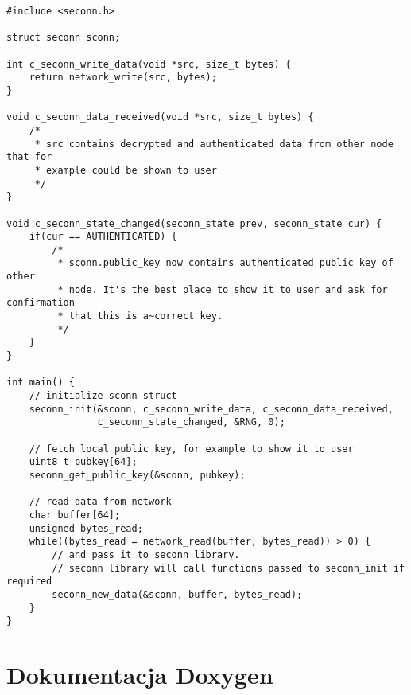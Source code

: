 \label{tab:sample-usage}
\begin{lstlisting}
#include <seconn.h>

struct seconn sconn;

int c_seconn_write_data(void *src, size_t bytes) {
    return network_write(src, bytes);
}

void c_seconn_data_received(void *src, size_t bytes) {
    /*
     * src contains decrypted and authenticated data from other node that for
     * example could be shown to user
     */
}

void c_seconn_state_changed(seconn_state prev, seconn_state cur) {
    if(cur == AUTHENTICATED) {
        /*
         * sconn.public_key now contains authenticated public key of other
         * node. It's the best place to show it to user and ask for confirmation
         * that this is a~correct key.
         */
    }
}

int main() {
    // initialize sconn struct
    seconn_init(&sconn, c_seconn_write_data, c_seconn_data_received,
                c_seconn_state_changed, &RNG, 0);

    // fetch local public key, for example to show it to user
    uint8_t pubkey[64];
    seconn_get_public_key(&sconn, pubkey);

    // read data from network
    char buffer[64];
    unsigned bytes_read;
    while((bytes_read = network_read(buffer, bytes_read)) > 0) {
        // and pass it to seconn library.
        // seconn library will call functions passed to seconn_init if required
        seconn_new_data(&sconn, buffer, bytes_read);
    }
}
\end{lstlisting}
\FloatBarrier

\section{Dokumentacja Doxygen}

